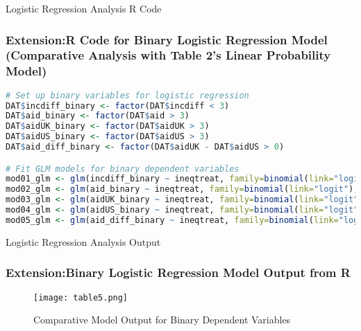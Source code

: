 \documentclass[aspectratio=169,10pt,compress]{beamer}
\begin{document}
\begin{frame}[fragile]{Logistic Regression Analysis R Code}
  \frametitle{Extension:R Code for Binary Logistic Regression Model (Comparative Analysis with Table 2's Linear Probability Model)}

  \begin{lstlisting}[language=R]
# Set up binary variables for logistic regression
DAT$incdiff_binary <- factor(DAT$incdiff < 3)
DAT$aid_binary <- factor(DAT$aid > 3)
DAT$aidUK_binary <- factor(DAT$aidUK > 3)
DAT$aidUS_binary <- factor(DAT$aidUS > 3)
DAT$aid_diff_binary <- factor(DAT$aidUK - DAT$aidUS > 0)

# Fit GLM models for binary dependent variables
mod01_glm <- glm(incdiff_binary ~ ineqtreat, family=binomial(link="logit"), data=DAT)
mod02_glm <- glm(aid_binary ~ ineqtreat, family=binomial(link="logit"), data=DAT)
mod03_glm <- glm(aidUK_binary ~ ineqtreat, family=binomial(link="logit"), data=DAT)
mod04_glm <- glm(aidUS_binary ~ ineqtreat, family=binomial(link="logit"), data=DAT)
mod05_glm <- glm(aid_diff_binary ~ ineqtreat, family=binomial(link="logit"), data=DAT)
  \end{lstlisting}
\end{frame}
\begin{frame}{Logistic Regression Analysis Output}
  \frametitle{Extension:Binary Logistic Regression Model Output from R}

  \begin{figure}
    \centering
    \texttt{[image: table5.png]}
    \caption{Comparative Model Output for Binary Dependent Variables}
  \end{figure}
\end{frame}
\end{document}
